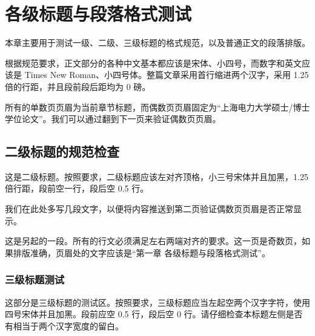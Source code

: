 \section{各级标题与段落格式测试}
本章主要用于测试一级、二级、三级标题的格式规范，以及普通正文的段落排版。

根据规范要求，正文部分的各种中文基本都应该是宋体、小四号，而数字和英文应该是 Times New Roman、小四号体。整篇文章采用首行缩进两个汉字，采用 1.25 倍的行距，并且段前段后距均为 0 磅。

所有的单数页页眉为当前章节标题，而偶数页页眉固定为“上海电力大学硕士/博士学位论文”。我们可以通过翻到下一页来验证偶数页页眉。

\subsection{二级标题的规范检查}
这是二级标题。按照要求，二级标题应该左对齐顶格，小三号宋体并且加黑，1.25倍行距，段前空一行，段后空 0.5 行。

我们在此处多写几段文字，以便将内容推送到第二页验证偶数页页眉是否正常显示。

这是另起的一段。所有的行文必须满足左右两端对齐的要求。这一页是奇数页，如果排版准确，页眉处的文字应该是“第一章 各级标题与段落格式测试”。

\subsubsection{三级标题测试}
这部分是三级标题的测试区。按照要求，三级标题应当左起空两个汉字字符，使用四号宋体并且加黑。段前应空 0.5 行，段后空 0 行。请仔细检查本标题左侧是否有相当于两个汉字宽度的留白。
